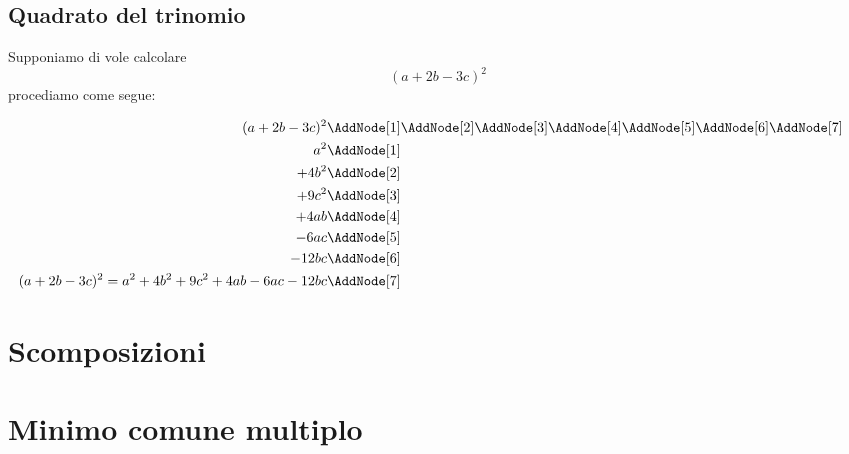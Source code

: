 \subsection{Quadrato del trinomio}
\begin{esempiot}{}{}
Supponiamo di vole calcolare \[(a+2b-3c)^2\]
procediamo come segue:
\begin{NodesList}
	\begin{align*}
(a+2b-3c)^2&\AddNode[1]\AddNode[2]\AddNode[3]\AddNode[4]\AddNode[5]\AddNode[6]\AddNode[7]\\
		a^2&\AddNode[1]&\\ 
		+4b^2&\AddNode[2]&\\
		+9c^2&\AddNode[3]\\
		+4ab&\AddNode[4]\\
		-6ac&\AddNode[5]\\
		-12bc&\AddNode[6]\\
		(a+2b-3c)^2=a^2+4b^2+9c^2+4ab-6ac-12bc&\AddNode[7]
	\end{align*}
\end{NodesList}
\end{esempiot}
\section{Scomposizioni}
\section{Minimo comune multiplo}

